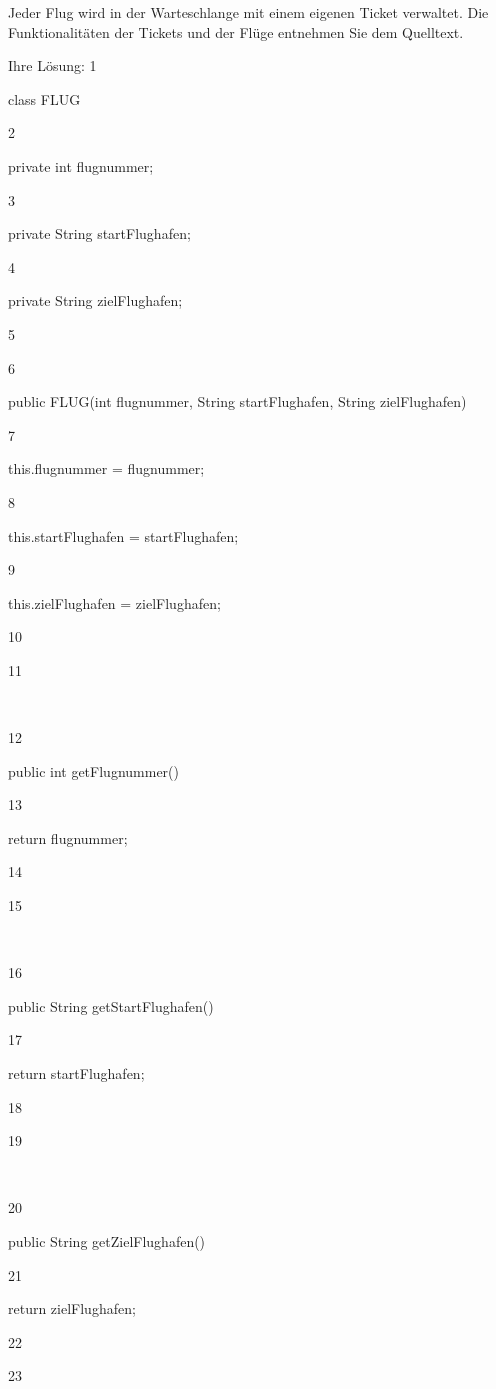 \documentclass{lehramt-informatik-haupt}
\begin{document}
{Jeder Flug wird in der Warteschlange mit einem eigenen Ticket verwaltet. Die Funktionalitäten der Tickets und der Flüge entnehmen Sie dem Quelltext.

Ihre Lösung:
1

class FLUG {

2

    private int flugnummer;

3

    private String startFlughafen;

4

    private String zielFlughafen;

5

6

    public FLUG(int flugnummer, String startFlughafen, String zielFlughafen) {

7

        this.flugnummer = flugnummer;

8

        this.startFlughafen = startFlughafen;

9

        this.zielFlughafen = zielFlughafen;

10

    }

11

​

12

    public int getFlugnummer() {

13

        return flugnummer;

14

    }

15

​

16

    public String getStartFlughafen() {

17

        return startFlughafen;

18

    }

19

​

20

    public String getZielFlughafen() {

21

        return zielFlughafen;

22

    }

23

}}
\end{document}

